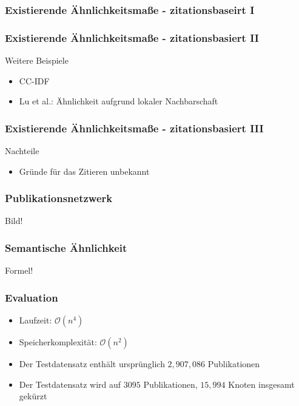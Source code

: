 \documentclass[12pt, xcolor=table]{beamer}
\begin{document}
\begin{frame}
    \frametitle{Existierende Ähnlichkeitsmaße - zitationsbaseirt I}
\end{frame}

\begin{frame}
    \frametitle{Existierende Ähnlichkeitsmaße - zitationsbasiert II}
    \begin{block}{Weitere Beispiele}
    \begin{itemize}
        \item CC-IDF
        \item Lu et al.: Ähnlichkeit aufgrund lokaler Nachbarschaft
    \end{itemize}
    \end{block}
\end{frame}

\begin{frame}
    \frametitle{Existierende Ähnlichkeitsmaße - zitationsbasiert III}
    \begin{block}{Nachteile}
    \begin{itemize}
        \item Gründe für das Zitieren unbekannt
    \end{itemize}
    \end{block}
\end{frame}

\begin{frame}
    \frametitle{Publikationsnetzwerk}
    Bild!
\end{frame}

\begin{frame}
    \frametitle{Semantische Ähnlichkeit}
    Formel!
\end{frame}

\begin{frame}
    \frametitle{Evaluation}
    \begin{itemize}
        \item Laufzeit: $\mathcal{O}(n^4)$
        \item Speicherkomplexität: $\mathcal{O}(n^2)$
        \item Der Testdatensatz enthält ursprünglich $2,907,086$ Publikationen
        \item Der Testdatensatz wird auf $3095$ Publikationen, $15,994$ Knoten insgesamt gekürzt
    \end{itemize}
\end{frame}
\end{document}
